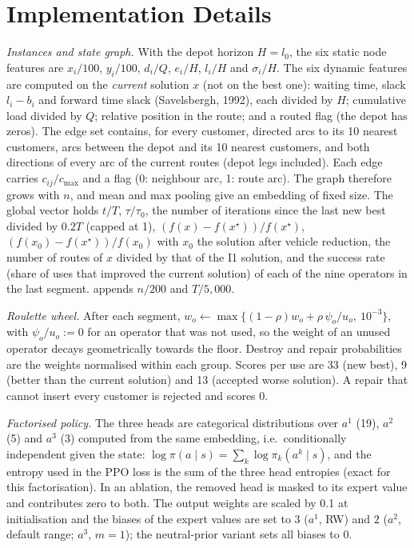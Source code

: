 \section*{Implementation Details}
\emph{Instances and state graph.} With the depot horizon $H=l_0$, the six static node features are $x_i/100$, $y_i/100$,
$d_i/Q$, $e_i/H$, $l_i/H$ and $\sigma_i/H$. The six dynamic features are computed on the \emph{current} solution $x$
(not on the best one): waiting time, slack $l_i-b_i$ and forward time slack (Savelsbergh, 1992), each divided by $H$;
cumulative load divided by $Q$; relative position in the route; and a routed flag (the depot has zeros). The edge set
contains, for every customer, directed arcs to its 10 nearest customers, arcs between the depot and its 10 nearest
customers, and both directions of every arc of the current routes (depot legs included). Each edge carries
$c_{ij}/c_{\max}$ and a flag (0: neighbour arc, 1: route arc). The graph therefore grows with $n$, and mean and max
pooling give an embedding of fixed size. The global vector holds $t/T$, $\tau/\tau_0$, the number of iterations since
the last new best divided by $0.2T$ (capped at 1), $(f(x)-f(x^\star))/f(x^\star)$, $(f(x_0)-f(x^\star))/f(x_0)$ with
$x_0$ the solution after vehicle reduction, the number of routes of $x$ divided by that of the I1 solution, and the
success rate (share of uses that improved the current solution) of each of the nine
operators in the last segment. \sgc{} appends $n/200$ and $T/5{,}000$.

\emph{Roulette wheel.} After each segment, $w_o\leftarrow\max\{(1-\rho)w_o+\rho\,\psi_o/u_o,\ 10^{-3}\}$, with
$\psi_o/u_o:=0$ for an operator that was not used, so the weight of an unused operator decays geometrically towards the
floor. Destroy and repair probabilities are the weights normalised within each group. Scores per use are 33 (new
best), 9 (better than the current solution) and 13 (accepted worse solution). A repair that cannot insert every customer is
rejected and scores 0.

\emph{Factorised policy.} The three heads are categorical distributions over $a^1$ (19), $a^2$ (5) and $a^3$ (3)
computed from the same embedding, i.e.\ conditionally independent given the state:
$\log\pi(a\mid s)=\sum_k\log\pi_k(a^k\mid s)$, and the entropy used in the PPO loss is the sum of the three head
entropies (exact for this factorisation). In an ablation, the removed head is masked to its expert value and
contributes zero to both. The output weights are scaled by 0.1 at initialisation and the biases of the expert values
are set to $3$ ($a^1$, RW) and $2$ ($a^2$, default range; $a^3$, $m=1$); the neutral-prior variant sets all biases to 0.

